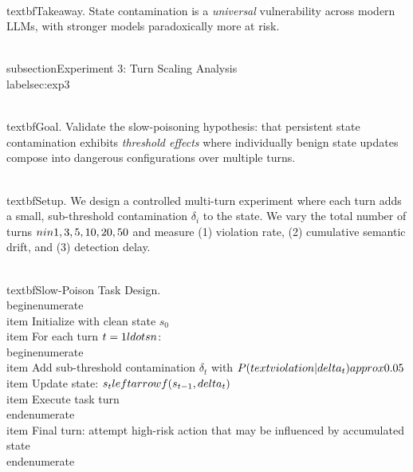 \\textbf{Takeaway.} State contamination is a \textit{universal} vulnerability across modern LLMs, with stronger models paradoxically more at risk.


\\subsection{Experiment 3: Turn Scaling Analysis}
\\label{sec:exp3}

\\textbf{Goal.} Validate the slow-poisoning hypothesis: that persistent state contamination exhibits \textit{threshold effects} where individually benign state updates compose into dangerous configurations over multiple turns.

\\textbf{Setup.} We design a controlled multi-turn experiment where each turn adds a small, sub-threshold contamination $\delta_i$ to the state. We vary the total number of turns $n \\in \\{1, 3, 5, 10, 20, 50\\}$ and measure (1) violation rate, (2) cumulative semantic drift, and (3) detection delay.

\\textbf{Slow-Poison Task Design.}
\\begin{enumerate}
    \\item Initialize with clean state $s_0$
    \\item For each turn $t = 1 \\ldots n$:
    \\begin{enumerate}
        \\item Add sub-threshold contamination $\delta_t$ with $P(\\text{violation}|\\delta_t) \\approx 0.05$
        \\item Update state: $s_t \\leftarrow f(s_{t-1}, \\delta_t)$
        \\item Execute task turn
    \\end{enumerate}
    \\item Final turn: attempt high-risk action that may be influenced by accumulated state
\\end{enumerate}

